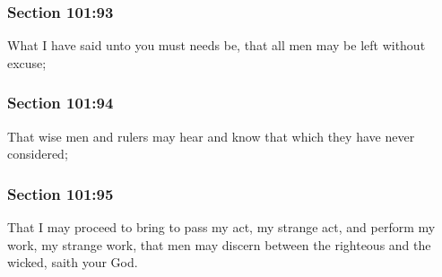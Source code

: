 	\subsubsection{Section 101:93} %
		\label{DC101-93}

		What I have said unto you must needs be, that all men may be left without excuse;


	\subsubsection{Section 101:94} %
		\label{DC101-94}

		That wise men and rulers may hear and know that which they have never considered;


	\subsubsection{Section 101:95} %
		\label{DC101-95}

		That I may proceed to bring to pass my act, my strange act, and perform my work, my strange work, that men may discern between the righteous and the wicked, saith your God.


